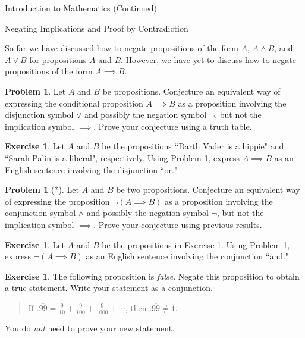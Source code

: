 \documentclass[11pt]{article}
\theoremstyle{definition}
\newtheorem{exercise}[theorem]{Exercise}
\newtheorem{problem}[theorem]{Problem}
\begin{document}
\addtocounter{section}{0}

\begin{section}{Introduction to Mathematics (Continued)}

\addtocounter{subsection}{2}
\addtocounter{theorem}{45}

\begin{subsection}{Negating Implications and Proof by Contradiction}

So far we have discussed how to negate propositions of the form $A$, $A\wedge B$, and $A\vee B$ for propositions $A$ and $B$.  However, we have yet to discuss how to negate propositions of the form $A\implies B$.

\begin{problem}\label{prob:implication as disjunction}
Let $A$ and $B$ be propositions.  Conjecture an equivalent way of expressing the conditional proposition $A\implies B$ as a proposition involving the disjunction symbol $\vee$ and possibly the negation symbol $\neg$, but not the implication symbol $\implies$.  Prove your conjecture using a truth table.
\end{problem}

\begin{exercise}\label{exer:Darth Vader}
Let $A$ and $B$ be the propositions ``Darth Vader is a hippie" and ``Sarah Palin is a liberal", respectively.  Using Problem \ref{prob:implication as disjunction}, express $A\implies B$ as an English sentence involving the disjunction ``or."
\end{exercise}

\begin{problem}[*]\label{prob:negation of implication}
Let $A$ and $B$ be two propositions.  Conjecture an equivalent way of expressing the proposition $\neg(A\implies B)$ as a proposition involving the conjunction symbol $\wedge$ and possibly the negation symbol $\neg$, but not the implication symbol $\implies$.  Prove your conjecture using previous results.
\end{problem}

\begin{exercise}
Let $A$ and $B$ be the propositions in Exercise \ref{exer:Darth Vader}.  Using Problem \ref{prob:negation of implication}, express $\neg(A\implies B)$ as an English sentence involving the conjunction ``and."
\end{exercise}

\begin{exercise}
The following proposition is \emph{false}.  Negate this proposition to obtain a true statement.  Write your statement as a conjunction.
\begin{quote}
If $.\overline{99}=\frac{9}{10}+\frac{9}{100}+\frac{9}{1000}+\cdots$, then $.\overline{99}\neq 1$.
\end{quote}
You do \emph{not} need to prove your new statement.
\end{exercise}


\end{subsection}
\end{section}
\end{document}
